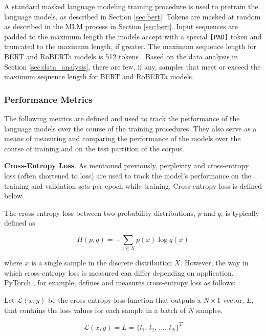 \documentclass[12pt]{article}
\begin{document}
A standard masked language modeling training procedure is used to pretrain the language models, as described in Section \ref{sec:bert}. Tokens are
masked at random as described in the MLM process in Section \ref{sec:bert}. Input sequences are padded to the maximum length the models accept with a
special \lstinline|[PAD]| token and truncated to the maximum length, if greater. The maximum sequence length for BERT and RoBERTa models is 512 tokens
\cite{devlin_bert_2019,liu_roberta_2019}. Based on the data analysis in Section \ref{sec:data_analysis}, there are few, if any, samples that meet or
exceed the maximum sequence length for BERT and RoBERTa models.

\subsubsection{Performance Metrics}\label{sec:performance_metrics}
The following metrics are defined and used to track the performance of the language models over the course of the training procedures. They also serve
as a means of measuring and comparing the performance of the models over the course of training and on the test partition of the corpus.

\textbf{Cross-Entropy Loss}. As mentioned previously, perplexity and cross-entropy loss (often shortened to loss) are used to track the model's
performance on the training and validation sets per epoch while training. Cross-entropy loss is defined below.

The cross-entropy loss between two probability distributions, $p$ and $q$, is typically defined as

\begin{equation}\label{eq:cross_entropy}
    H(p, q) = -\sum_{x \in X} p(x) \log q(x)
\end{equation}

\noindent
where $x$ is a single sample in the discrete distribution $X$. However, the way in which cross-entropy loss is measured can differ depending on
application. PyTorch \cite{paszke_pytorch_2019}, for example, defines and measures cross-entropy loss as follows:

Let $\mathcal{L}(x, y)$ be the cross-entropy loss function that outputs a $N \times 1$ vector, $L$, that contains the loss values for each sample in
a batch of $N$ samples.

\begin{equation}\label{eq:cross_entropy_defs}
    \mathcal{L}(x, y) = L = \{\mbox{$l_1$, $l_2$, ..., $l_N$}\}^T
\end{equation}
\end{document}
